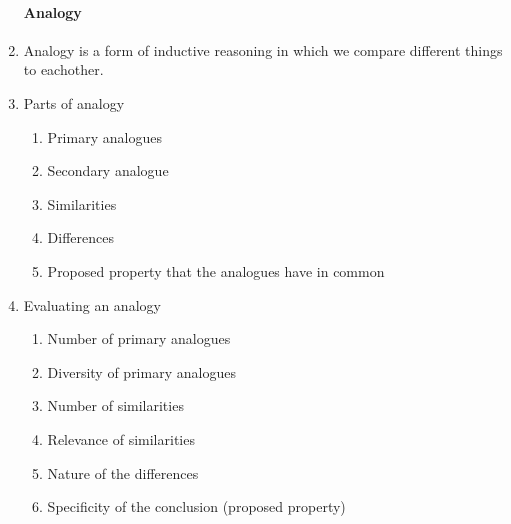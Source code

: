 \documentclass[10pt,landscape]{article}
\begin{document}
\begin{multicols}{2}
\begin{enumerate}
\paragraph{Analogy}
    \item Analogy is a form of inductive reasoning in which we compare different things to eachother.
    \item Parts of analogy
      \begin{enumerate}
       \item Primary analogues
       \item Secondary analogue
       \item Similarities
       \item Differences
       \item Proposed property that the analogues have in common
      \end{enumerate}
    \item Evaluating an analogy
      \begin{enumerate}
       \item Number of primary analogues
       \item Diversity of primary analogues
       \item Number of similarities
       \item Relevance of similarities
       \item Nature of the differences
       \item Specificity of the conclusion (proposed property)
      \end{enumerate}
  

\end{enumerate}
\end{multicols}
\end{document}
